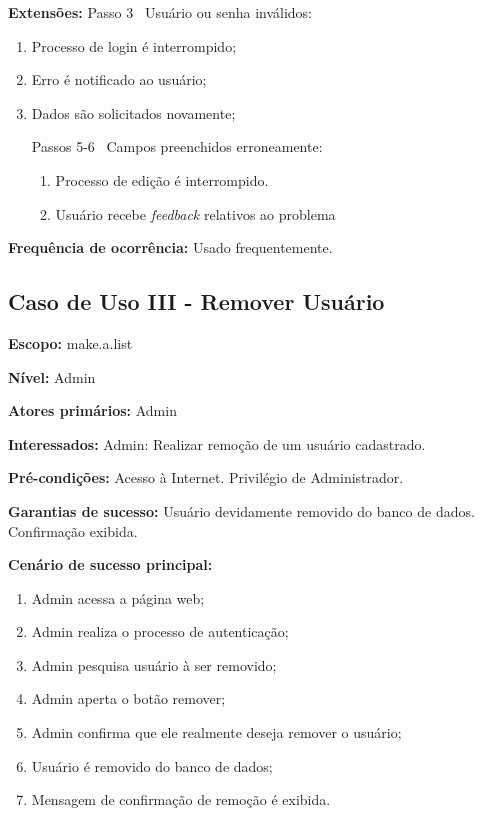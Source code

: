 \documentclass[12pt,oneside,a4paper,article]{abntex2}
\begin{document}
		\textbf{Extensões:} Passo 3 \textrightarrow \ Usuário ou senha inválidos:
		
		\begin{enumerate}[label=\alph*.]	
			\item Processo de login é interrompido;
			\item Erro é notificado ao usuário;
			\item Dados são solicitados novamente;	
			
		Passos 5-6 \textrightarrow \ Campos preenchidos erroneamente:
		
		\begin{enumerate}[label=\alph*.]	
			\item Processo de edição é interrompido.
			\item Usuário recebe \textit{feedback} relativos ao problema	
		\end{enumerate}
		
		\end{enumerate}
		
		\textbf{Frequência de ocorrência:} Usado frequentemente.
		
		\subsection{Caso de Uso III - Remover Usuário}
				
		\textbf{Escopo:} make.a.list 
		
		\textbf{Nível:} Admin
		
		\textbf{Atores primários:} Admin
		
		\textbf{Interessados:} Admin: Realizar remoção de um usuário cadastrado.
		
		\textbf{Pré-condições:} Acesso à Internet. Privilégio de Administrador.
		
		\textbf{Garantias de sucesso:} Usuário devidamente removido do banco de dados. Confirmação exibida.
		
		\textbf{Cenário de sucesso principal:}
		
		\begin{enumerate}
			\item Admin acessa a página web;
			
			\item Admin realiza o processo de autenticação;
			
			\item Admin pesquisa usuário à ser removido;
			
			\item Admin aperta o botão remover;
			
			\item Admin confirma que ele realmente deseja remover o usuário;
			
			\item Usuário é removido do banco de dados;
			
			\item Mensagem de confirmação de remoção é exibida.
			
		\end{enumerate}
		
\end{document}
